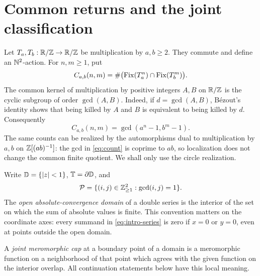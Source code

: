 \section{Common returns and the joint classification}\label{sec:statement}

Let \(T_a,T_b:\mathbb R/\mathbb Z\to\mathbb R/\mathbb Z\) be multiplication by \(a,b\geq2\).
They commute and define an \(\mathbb N^2\)-action. For \(n,m\geq1\), put
\[
C_{a,b}(n,m)=\#\bigl(\operatorname{Fix}(T_a^n)\cap\operatorname{Fix}(T_b^m)\bigr).
\]
The common kernel of multiplication by positive integers \(A,B\)
on \(\mathbb R/\mathbb Z\) is the cyclic subgroup of order \(\gcd(A,B)\).
Indeed, if \(d=\gcd(A,B)\), B\'ezout's identity shows that being killed
by \(A\) and \(B\) is equivalent to being killed by \(d\).
Consequently
\begin{equation}\label{eq:count}
C_{a,b}(n,m)=\gcd(a^n-1,b^m-1).
\end{equation}
The same counts can be realized by the automorphisms dual to
multiplication by \(a,b\) on \(\mathbb Z[(ab)^{-1}]\): the gcd in
\eqref{eq:count} is coprime to \(ab\), so localization does not change
the common finite quotient. We shall only use the circle realization.

Write \(\mathbb D=\{|z|<1\}\), \(\mathbb T=\partial\mathbb D\), and
\[
\mathcal P=\{(i,j)\in\mathbb Z_{\geq1}^2:\gcd(i,j)=1\}.
\]
The \emph{open absolute-convergence domain} of a double series is
the interior of the set on which the sum of absolute values is finite.
This convention matters on the coordinate axes: every summand in
\eqref{eq:intro-series} is zero if \(x=0\) or \(y=0\), even at points
outside the open domain.

A \emph{joint meromorphic cap} at a boundary point of a domain is a
meromorphic function on a neighborhood of that point which agrees
with the given function on the interior overlap. All continuation
statements below have this local meaning.


